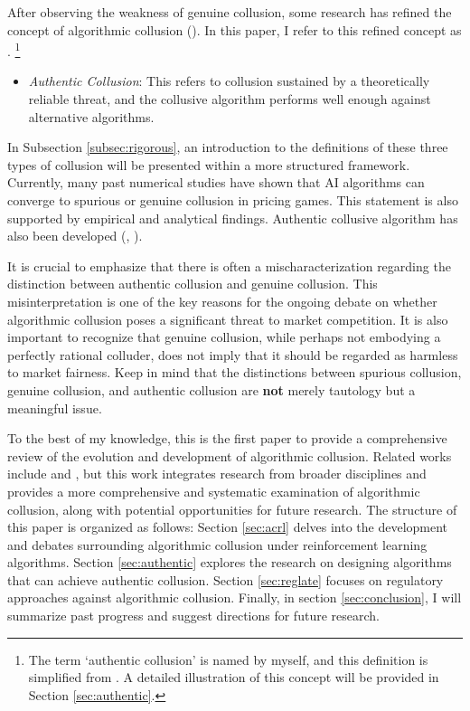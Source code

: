 \documentclass[mnsc,nonblindrev]{workingpaper}
\begin{document}
After observing the weakness of genuine collusion, some research has refined the concept of algorithmic collusion (\cite{den2023mathematical}). In this paper, I refer to this refined concept as . \footnote{The term `authentic collusion' is named by myself, and this definition is simplified from \cite{den2023mathematical}. A detailed illustration of this concept will be provided in Section \ref{sec:authentic}.}

\begin{itemize}
	\item \textit{Authentic Collusion}: This refers to collusion sustained by a theoretically reliable threat, and the collusive algorithm performs well enough against alternative algorithms.
\end{itemize}

In Subsection \ref{subsec:rigorous}, an introduction to the definitions of these three types of collusion will be presented within a more structured framework. Currently, many past numerical studies have shown that AI algorithms can converge to spurious or genuine collusion in pricing games. This statement is also supported by empirical and analytical findings. Authentic collusive algorithm has also been developed (\cite{meylahn2022learning}, \cite{loots2023data}). 

It is crucial to emphasize that there is often a mischaracterization regarding the distinction between authentic collusion and genuine collusion. This misinterpretation is one of the key reasons for the ongoing debate on whether algorithmic collusion poses a significant threat to market competition. It is also important to recognize that genuine collusion, while perhaps not embodying a perfectly rational colluder, does not imply that it should be regarded as harmless to market fairness. Keep in mind that the distinctions between spurious collusion, genuine collusion, and authentic collusion are \textbf{not} merely tautology but a meaningful issue.
                
To the best of my knowledge, this is the first paper to provide a comprehensive review of the evolution and development of algorithmic collusion. Related works include \cite{assad2021autonomous} and \cite{dorner2021algorithmic}, but this work integrates research from broader disciplines and provides a more comprehensive and systematic examination of algorithmic collusion, along with potential opportunities for future research. The structure of this paper is organized as follows: Section \ref{sec:acrl} delves into the development and debates surrounding algorithmic collusion under reinforcement learning algorithms. Section \ref{sec:authentic} explores the research on designing algorithms that can achieve authentic collusion. Section \ref{sec:reglate} focuses on regulatory approaches against algorithmic collusion. Finally, in section \ref{sec:conclusion}, I will summarize past progress and suggest directions for future research.
\end{document}
